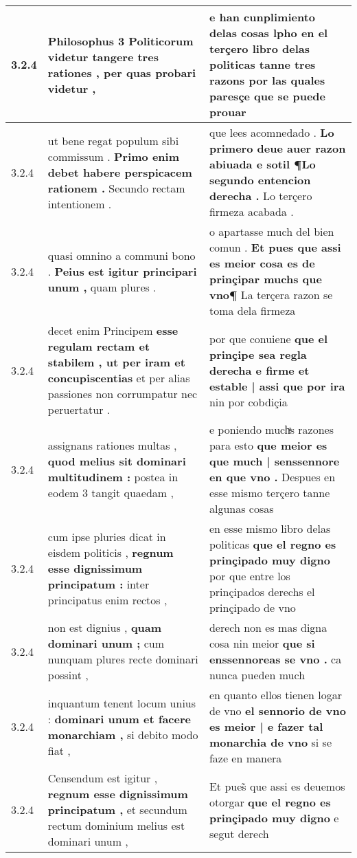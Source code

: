 \begin{tabular}{|p{1cm}|p{6.5cm}|p{6.5cm}|}
3.2.4 & Philosophus 3 Politicorum videtur \textbf{ tangere tres rationes , } per quas probari videtur , & e han cunplimiento delas cosas \textbf{ lpho en el terçero libro delas politicas tanne tres razons } por las quales paresçe que se puede prouar \\\hline
3.2.4 & ut bene regat populum sibi commissum . \textbf{ Primo enim debet habere perspicacem rationem . } Secundo rectam intentionem . & que lees acomnedado . \textbf{ Lo primero deue auer razon abiuada e sotil ¶Lo segundo entencion derecha . } Lo terçero firmeza acabada . \\\hline
3.2.4 & quasi omnino a communi bono . \textbf{ Peius est igitur principari unum , } quam plures . & o apartasse much del bien comun . \textbf{ Et pues que assi es meior cosa es de prinçipar muchs que vno¶ } La terçera razon se toma dela firmeza \\\hline
3.2.4 & decet enim Principem \textbf{ esse regulam rectam et stabilem , ut per iram et concupiscentias } et per alias passiones non corrumpatur nec peruertatur . & por que conuiene \textbf{ que el prinçipe sea regla derecha e firme et estable | assi que por ira } nin por cobdiçia \\\hline
3.2.4 & assignans rationes multas , \textbf{ quod melius sit dominari multitudinem : } postea in eodem 3 tangit quaedam , & e poniendo muchͣs razones para esto \textbf{ que meior es que much | senssennore en que vno . } Despues en esse mismo terçero tanne algunas cosas \\\hline
3.2.4 & cum ipse pluries dicat in eisdem politicis , \textbf{ regnum esse dignissimum principatum : } inter principatus enim rectos , & en esse mismo libro delas politicas \textbf{ que el regno es prinçipado muy digno } por que entre los prinçipados derechs el prinçipado de vno \\\hline
3.2.4 & non est dignius , \textbf{ quam dominari unum ; } cum nunquam plures recte dominari possint , & derech non es mas digna cosa nin meior \textbf{ que si enssennoreas se vno . } ca nunca pueden much \\\hline
3.2.4 & inquantum tenent locum unius : \textbf{ dominari unum et facere monarchiam , } si debito modo fiat , & en quanto ellos tienen logar de vno \textbf{ el sennorio de vno es meior | e fazer tal monarchia de vno } si se faze en manera \\\hline
3.2.4 & Censendum est igitur , \textbf{ regnum esse dignissimum principatum , } et secundum rectum dominium melius est dominari unum , & Et pues̃ que assi es deuemos otorgar \textbf{ que el regno es prinçipado muy digno } e segut derech \\\hline

\end{tabular}
